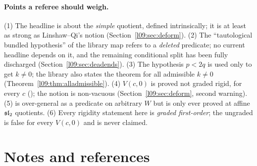 \paragraph{Points a referee should weigh.}
(1) The headline is about the \emph{simple} quotient, defined intrinsically; it is at least as strong as
Linshaw--Qi's notion (Section~\ref{l09:sec:deform}). (2) The ``tautological bundled hypothesis'' of the
library map refers to a \emph{deleted} predicate; no current headline depends on it, and the
remaining conditional split has been fully discharged (Section~\ref{l09:sec:deadends}). (3) The
hypothesis $p<2q$ is used only to get $k\neq0$; the library also states the theorem for all admissible
$k\neq0$ (Theorem~\ref{l09:thm:alladmissible}). (4) $V(c,0)$ is proved not graded rigid, for every $c$ (); the notion is
non-vacuous (Section~\ref{l09:sec:deform}, second warning). (5)
 is over-general as a predicate on arbitrary $W$ but is only ever
proved at affine $\mathfrak{sl}_2$ quotients. (6) Every rigidity statement here is
\emph{graded first-order}; the ungraded  is false for every $V(c,0)$ and is never claimed.

\section{Notes and references}\label{l09:sec:notes}

